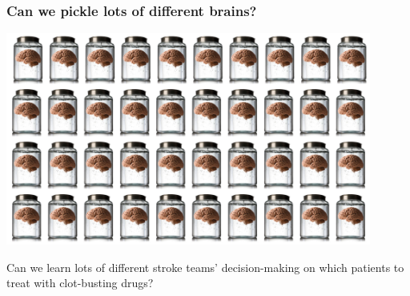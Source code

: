 \begin{frame}
\frametitle{Can we pickle lots of different brains?}

\begin{center}
\includegraphics[width=0.9\textwidth]{./images/brains}

\vspace{3mm}
\small{Can we learn lots of different stroke teams' decision-making on which patients to treat with clot-busting drugs?}
\end{center}   

\end{frame}